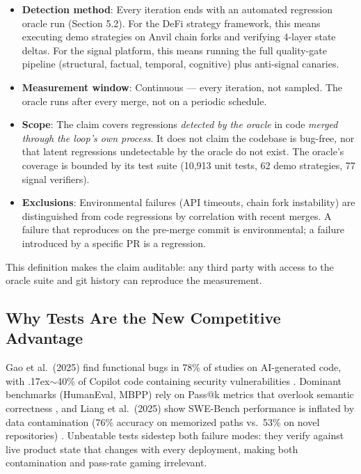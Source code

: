 \documentclass[11pt,a4paper]{article}
\newcommand{\roughly}{{\textraisebox{.17ex}{$\scriptstyle\sim$}}}
\newcommand{\textraisebox}[2]{\leavevmode\raise#1\hbox{#2}}
\providecommand{\tightlist}{%
  \setlength{\itemsep}{0pt}\setlength{\parskip}{0pt}}
\begin{document}
\begin{itemize}
\tightlist
\item
  \textbf{Detection method}: Every iteration ends with an automated regression oracle run (Section 5.2). For the DeFi strategy framework, this means executing demo strategies on Anvil chain forks and verifying 4-layer state deltas. For the signal platform, this means running the full quality-gate pipeline (structural, factual, temporal, cognitive) plus anti-signal canaries.
\item
  \textbf{Measurement window}: Continuous --- every iteration, not sampled. The oracle runs after every merge, not on a periodic schedule.
\item
  \textbf{Scope}: The claim covers regressions \emph{detected by the oracle} in code \emph{merged through the loop's own process}. It does not claim the codebase is bug-free, nor that latent regressions undetectable by the oracle do not exist. The oracle's coverage is bounded by its test suite (10,913 unit tests, 62 demo strategies, 77 signal verifiers).
\item
  \textbf{Exclusions}: Environmental failures (API timeouts, chain fork instability) are distinguished from code regressions by correlation with recent merges. A failure that reproduces on the pre-merge commit is environmental; a failure introduced by a specific PR is a regression.
\end{itemize}

This definition makes the claim auditable: any third party with access to the oracle suite and git history can reproduce the measurement.

\subsection{Why Tests Are the New Competitive Advantage}\label{sec:why-tests-are-the-new-competitive-advantage}

Gao et al.~(2025) find functional bugs in 78\% of studies on AI-generated code, with \roughly40\% of Copilot code containing security vulnerabilities \cite{gao2025}. Dominant benchmarks (HumanEval, MBPP) rely on Pass@k metrics that overlook semantic correctness \cite{gao2025}, and Liang et al.~(2025) show SWE-Bench performance is inflated by data contamination (76\% accuracy on memorized paths vs.~53\% on novel repositories) \cite{liang2025}. Unbeatable tests sidestep both failure modes: they verify against live product state that changes with every deployment, making both contamination and pass-rate gaming irrelevant.
\end{document}
